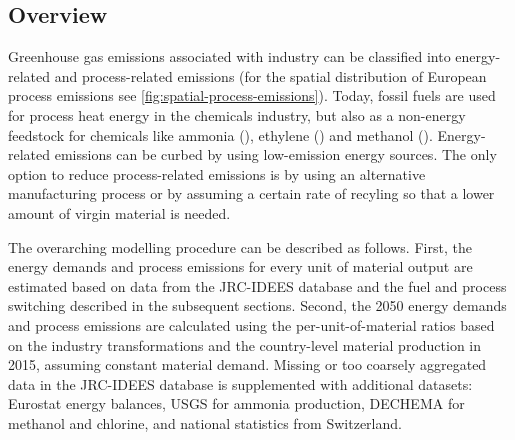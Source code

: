 \subsection{Overview}
\label{sec:si:industry:overview}

Greenhouse gas emissions associated with industry can be classified into
energy-related and process-related emissions (for the spatial distribution of
European process emissions see \cref{fig:spatial-process-emissions}). Today,
fossil fuels are used for process heat energy in the chemicals industry, but
also as a non-energy feedstock for chemicals like ammonia (), ethylene
() and methanol (). Energy-related emissions can be curbed by
using low-emission energy sources. The only option to reduce process-related
emissions is by using an alternative manufacturing process or by assuming a
certain rate of recyling so that a lower amount of virgin material is needed.

The overarching modelling procedure can be described as follows. First, the
energy demands and process emissions for every unit of material output are
estimated based on data from the JRC-IDEES
database
and the fuel and process switching described in the subsequent sections. Second,
the 2050 energy demands and process emissions are calculated using the
per-unit-of-material ratios based on the industry transformations and the
country-level material production in
2015,
assuming constant material demand. Missing or too coarsely aggregated data in
the JRC-IDEES
database is
supplemented with additional datasets: Eurostat energy
balances, USGS for ammonia
production, DECHEMA for
methanol and chlorine, and national statistics from
Switzerland.

